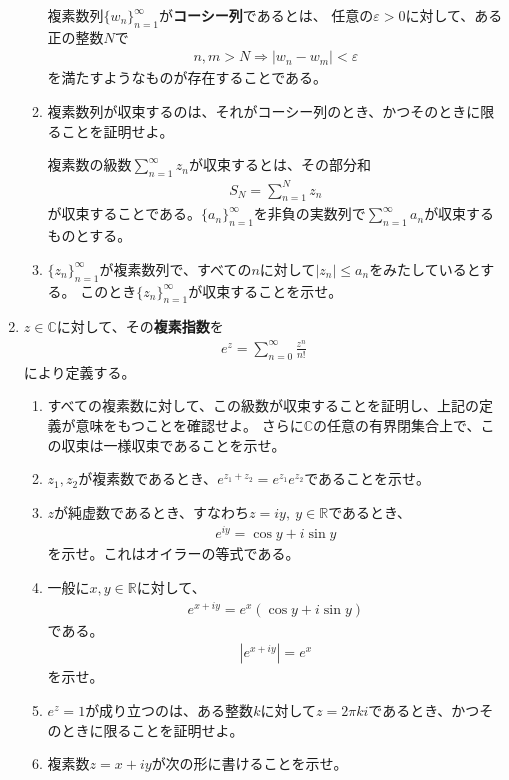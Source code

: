 \documentclass{jreport}
\begin{document}
\begin{enumerate}[label=\textbf{\arabic*.}]
\begin{enumerate}
複素数列$\{w_{n}\}_{n=1}^{\infty}$が\textbf{コーシー列}であるとは、
任意の$\varepsilon>0$に対して、ある正の整数$N$で
\begin{align}
n,m>N\Rightarrow|w_{n}-w_{m}|<\varepsilon
\end{align}
を満たすようなものが存在することである。
\item 複素数列が収束するのは、それがコーシー列のとき、かつそのときに限ることを証明せよ。

複素数の級数$\sum_{n=1}^{\infty}z_{n}$が収束するとは、その部分和
\begin{align}
S_{N}=\sum_{n=1}^{N}z_{n}
\end{align}
が収束することである。$\{a_{n}\}_{n=1}^{\infty}$を非負の実数列で$\sum_{n=1}^{\infty}a_{n}$が収束するものとする。
\item $\{z_{n}\}_{n=1}^{\infty}$が複素数列で、すべての$n$に対して$|z_{n}|\leq a_{n}$をみたしているとする。
このとき$\{z_{n}\}_{n=1}^{\infty}$が収束することを示せ。
\end{enumerate}
\item $z\in\mathbb{C}$に対して、その\textbf{複素指数}を
\begin{align}
e^{z}=\sum_{n=0}^{\infty}\frac{z^{n}}{n!}
\end{align}
により定義する。
\begin{enumerate}
\item すべての複素数に対して、この級数が収束することを証明し、上記の定義が意味をもつことを確認せよ。
さらに$\mathbb{C}$の任意の有界閉集合上で、この収束は一様収束であることを示せ。
\item $z_{1},z_{2}$が複素数であるとき、$e^{z_{1}+z_{2}}=e^{z_{1}}e^{z_{2}}$であることを示せ。
\item $z$が純虚数であるとき、すなわち$z=iy,\ y\in\mathbb{R}$であるとき、
\begin{align}
e^{iy}=\cos y+i\sin y
\end{align}
を示せ。これはオイラーの等式である。
\item 一般に$x,y\in\mathbb{R}$に対して、
\begin{align}
    e^{x+iy}=e^{x}(\cos y+i\sin y)
\end{align}
である。
\begin{align}
|e^{x+iy}|=e^{x}
\end{align}
を示せ。
\item $e^{z}=1$が成り立つのは、ある整数$k$に対して$z=2\pi ki$であるとき、かつそのときに限ることを証明せよ。
\item 複素数$z=x+iy$が次の形に書けることを示せ。
\begin{align}

\end{align}
\end{enumerate}
\end{enumerate}
\end{document}
